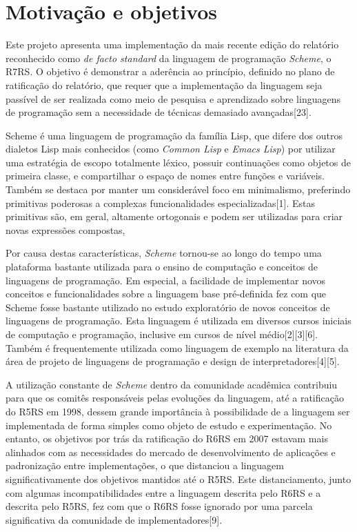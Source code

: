 \section{Motivação e objetivos}
\label{sec:motivacao}

Este projeto apresenta uma implementação da mais recente edição do relatório
reconhecido como \textit{de facto standard} da linguagem de programação
\textit{Scheme}, o \acs{R7RS}. O objetivo é demonstrar a aderência ao
princípio, definido no plano de ratificação do relatório, que requer que a
implementação da linguagem seja passível de ser realizada como meio de pesquisa
e aprendizado sobre linguagens de programação sem a necessidade de técnicas
demasiado avançadas[23].

Scheme é uma linguagem de programação da família Lisp, que difere dos outros
dialetos Lisp  mais conhecidos (como \textit{Common Lisp} e \textit{Emacs
Lisp}) por utilizar uma estratégia de escopo totalmente léxico, possuir
continuações como objetos de primeira classe, e compartilhar o espaço de nomes
entre funções e variáveis. Também se destaca por manter um considerável foco em
minimalismo, preferindo primitivas poderosas a complexas funcionalidades
especializadas[1]. Estas primitivas são, em geral, altamente ortogonais e podem
ser utilizadas para criar novas expressões compostas,

Por causa destas características, \textit{Scheme} tornou-se ao longo do tempo
uma plataforma bastante utilizada para o ensino de computação e conceitos de
linguagens de programação. Em especial, a facilidade de implementar novos
conceitos e funcionalidades sobre a linguagem base pré-definida fez com que
Scheme fosse bastante utilizado no estudo exploratório de novos conceitos de
linguagens de programação. Esta linguagem é utilizada em diversos cursos
iniciais de computação e programação, inclusive em cursos de nível
médio[2][3][6]. Também é frequentemente utilizada como linguagem de exemplo na
literatura da área de projeto de linguagens de programação e design de
interpretadores[4][5].


A utilização constante de \textit{Scheme} dentro da comunidade acadêmica
contribuiu para que os comitês responsáveis pelas evoluções da linguagem, até a
ratificação do \acs{R5RS} em 1998, dessem grande importância à possibilidade de
a linguagem ser implementada de forma simples como objeto de estudo e
experimentação. No entanto, os objetivos por trás da ratificação do \acs{R6RS}
em 2007 estavam mais alinhados com as necessidades do mercado de
desenvolvimento de aplicações e padronização entre implementações, o que
distanciou a linguagem significativamente dos objetivos mantidos até o
\acs{R5RS}. Este distanciamento, junto com algumas incompatibilidades entre a
linguagem descrita pelo \acs{R6RS} e a descrita pelo \acs{R5RS}, fez com que o
\acs{R6RS} fosse ignorado por uma parcela significativa da comunidade de 
implementadores[9].

